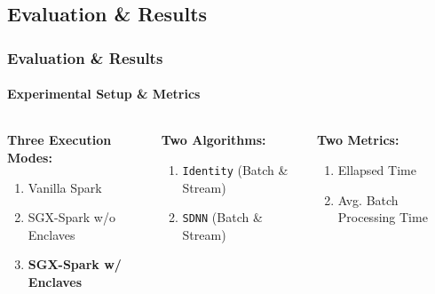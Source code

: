 \documentclass[10pt,    %
    english,            %
    xcolor=table,       %
    envcountsect,        %
    aspectratio=169     %
]{beamer}
\begin{document}
\subsection{Evaluation \& Results}

\begin{frame}
    \frametitle{Evaluation \& Results}
    \framesubtitle{Experimental Setup \& Metrics}

    \vspace{-20pt}

    \begin{columns}[T]
        \begin{column}{.38\textwidth}
            \textbf{Three Execution Modes:}
            \begin{enumerate}
                \item Vanilla Spark
                \item SGX-Spark w/o Enclaves
                \item \textbf{\textcolor{fgRed}{SGX-Spark w/ Enclaves}}
            \end{enumerate}
        \end{column}
        \begin{column}{.3\textwidth}
            \textbf{Two Algorithms:}
            \begin{enumerate}
                \item \texttt{Identity} (Batch \& Stream)
                \item \texttt{SDNN} (Batch \& Stream)
            \end{enumerate}
        \end{column}
        \begin{column}{.3\textwidth}
            \textbf{Two Metrics:}
            \begin{enumerate}
                \item Ellapsed Time
                \item Avg. Batch Processing Time
            \end{enumerate}
        \end{column}
    \end{columns}


\end{frame}
\end{document}
